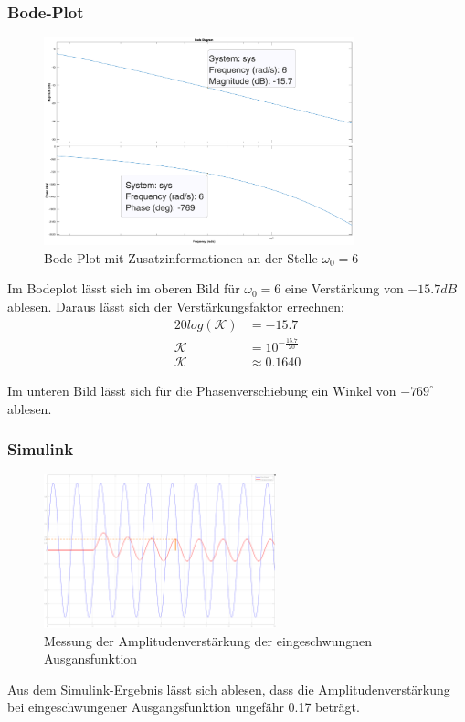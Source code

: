 \subsubsection{Bode-Plot}
\begin{figure}[H]
    \label{fig:bodePlot}
    \label{fig:lassmich}
    \centering
    \includegraphics[width=0.8\textwidth]{Bilder/bodeMitZeichen.eps}
    \caption{Bode-Plot mit Zusatzinformationen an der Stelle $ \omega_0 = 6$}
 \end{figure}

Im Bodeplot lässt sich im oberen Bild für $\omega_0 = 6$ eine Verstärkung von $-15.7 dB$ ablesen. Daraus lässt sich der Verstärkungsfaktor errechnen:
\begin{align*}
    20 log(\mathcal{K}) &= - 15.7\\
        \mathcal{K} &= 10^{-\frac{15.7}{20}}\\
        \mathcal{K} & \approx 0.1640
\end{align*}

Im unteren Bild lässt sich für die Phasenverschiebung ein Winkel von $-769^{\circ}$ ablesen.


\subsubsection{Simulink}


\begin{figure}[H]
    \centering
    \includegraphics[width=0.6\textwidth]{Bilder/Simulink-Amplitude.png}
    \caption[width=0.6\textwidth]{Messung der Amplitudenverstärkung der eingeschwungnen Ausgansfunktion}
 \end{figure}
 Aus dem Simulink-Ergebnis lässt sich ablesen, dass die Amplitudenverstärkung bei eingeschwungener Ausgangsfunktion ungefähr 0.17 beträgt.

